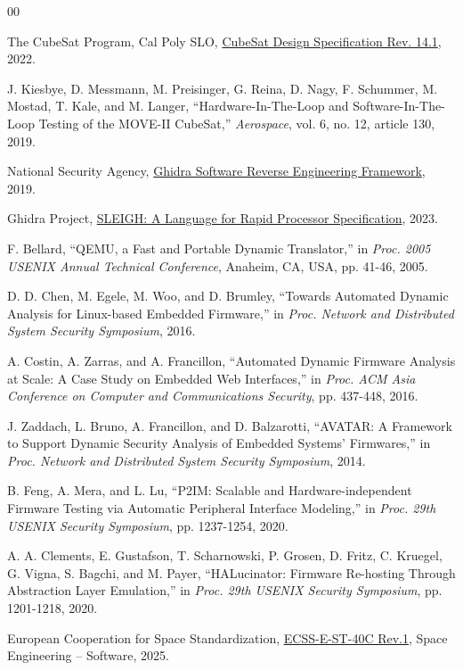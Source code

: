 \documentclass[master,korean,final]{kaist-ucs}
\begin{document}
\begin{thebibliography}{00}

 The CubeSat Program, Cal Poly SLO, \underline{CubeSat Design Specification Rev. 14.1}, 2022.

 J. Kiesbye, D. Messmann, M. Preisinger, G. Reina, D. Nagy, F. Schummer, M. Mostad, T. Kale, and M. Langer, “Hardware-In-The-Loop and Software-In-The-Loop Testing of the MOVE-II CubeSat,” \textit{Aerospace}, vol. 6, no. 12, article 130, 2019.

 National Security Agency, \underline{Ghidra Software Reverse Engineering Framework}, 2019.

 Ghidra Project, \underline{SLEIGH: A Language for Rapid Processor Specification}, 2023.

 F. Bellard, “QEMU, a Fast and Portable Dynamic Translator,” in \textit{Proc. 2005 USENIX Annual Technical Conference}, Anaheim, CA, USA, pp. 41-46, 2005.

 D. D. Chen, M. Egele, M. Woo, and D. Brumley, “Towards Automated Dynamic Analysis for Linux-based Embedded Firmware,” in \textit{Proc. Network and Distributed System Security Symposium}, 2016.

 A. Costin, A. Zarras, and A. Francillon, “Automated Dynamic Firmware Analysis at Scale: A Case Study on Embedded Web Interfaces,” in \textit{Proc. ACM Asia Conference on Computer and Communications Security}, pp. 437-448, 2016.

 J. Zaddach, L. Bruno, A. Francillon, and D. Balzarotti, “AVATAR: A Framework to Support Dynamic Security Analysis of Embedded Systems' Firmwares,” in \textit{Proc. Network and Distributed System Security Symposium}, 2014.

 B. Feng, A. Mera, and L. Lu, “P2IM: Scalable and Hardware-independent Firmware Testing via Automatic Peripheral Interface Modeling,” in \textit{Proc. 29th USENIX Security Symposium}, pp. 1237-1254, 2020.

 A. A. Clements, E. Gustafson, T. Scharnowski, P. Grosen, D. Fritz, C. Kruegel, G. Vigna, S. Bagchi, and M. Payer, “HALucinator: Firmware Re-hosting Through Abstraction Layer Emulation,” in \textit{Proc. 29th USENIX Security Symposium}, pp. 1201-1218, 2020.

 European Cooperation for Space Standardization, \underline{ECSS-E-ST-40C Rev.1}, Space Engineering -- Software, 2025.


\end{thebibliography}
\end{document}
